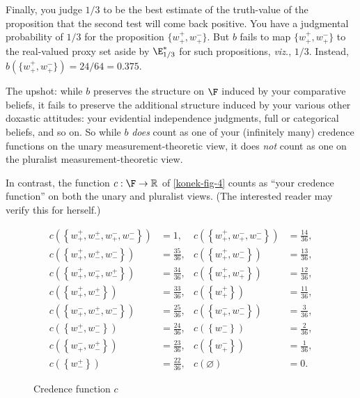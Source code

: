 Finally, you judge $1/3$ to be the best estimate of the truth-value of the proposition that the second test will come back positive. You have a judgmental probability of $1/3$ for the proposition $\{w^+_+,w^-_+\}$. But $b$ fails to map $\{w^+_+,w^-_+\}$ to the real-valued proxy set aside by $\E^*_{1/3}$ for such propositions, \textit{viz.}, $1/3$. Instead, $b(\{w^+_+,w^-_+\})=24/64=0.375$.

The upshot: while $b$ preserves the structure on $\F$ induced by your comparative beliefs, it fails to preserve the additional structure induced by your various other doxastic attitudes: your evidential independence judgments, full or categorical beliefs, and so on. So while $b$ \emph{does} count as one of your (infinitely many) credence functions on the unary measurement-theoretic view, it does \emph{not} count as one on the pluralist measurement-theoretic view.

In contrast, the function $c:\F\rightarrow\mathbb{R}$ of \autoref{konek-fig-4} counts as ``your credence function'' on both the unary and pluralist views. (The interested reader may verify this for herself.)
\begin{figure}[ht]
$$
\begin{aligned}
c(\left\{w^+_+,w^+_-,w^-_+,w^-_-\right\})&=1, & c(\left\{w^+_+,w^-_+,w^-_-\right\})&=\frac{14}{36},\\
c(\left\{w^+_+,w^+_-,w^-_-\right\})&=\frac{35}{36}, & c(\left\{w^+_+,w^-_-\right\})&=\frac{13}{36},\\
c(\left\{w^+_+,w^-_+,w^+_-\right\})&=\frac{34}{36}, & c(\left\{w^+_+,w^-_+\right\})&=\frac{12}{36},\\
c(\left\{w^+_+,w^+_-\right\})&=\frac{33}{36}, & c(\left\{w^+_+\right\})&=\frac{11}{36},\\
c(\left\{w^-_+,w^+_-,w^-_-\right\})&=\frac{25}{36}, & c(\left\{w^-_+,w^-_-\right\})&=\frac{3}{36},\\
c(\left\{w^+_-,w^-_-\right\})&=\frac{24}{36}, & c(\left\{w^-_-\right\})&=\frac{2}{36},\\
c(\left\{w^-_+,w^+_-\right\})&=\frac{23}{36}, & c(\left\{w^-_+\right\})&=\frac{1}{36},\\
c(\left\{w^+_-\right\})&=\frac{22}{36}, & c(\varnothing)&=0.
\end{aligned}
$$
\caption{Credence function $c$}\label{konek-fig-4}
\end{figure}

